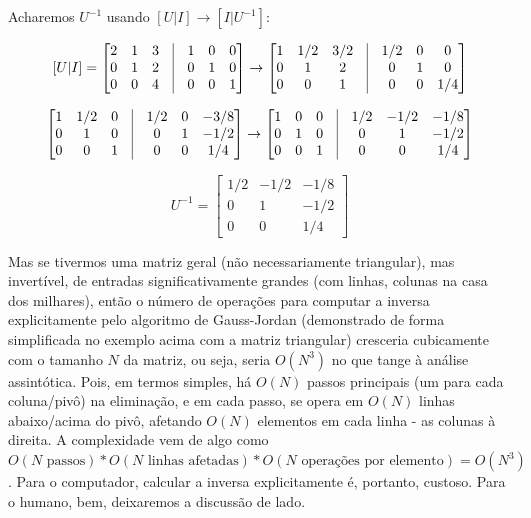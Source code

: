 \documentclass{article}
\begin{document}
    Acharemos $U^{-1}$ usando $[U|I] \rightarrow [I|U^{-1}]$:

    \[
    [U|I] = 
    \begin{bmatrix}
    2 & 1 & 3 & \vline & 1 & 0 & 0 \\
    0 & 1 & 2 & \vline & 0 & 1 & 0 \\
    0 & 0 & 4 & \vline & 0 & 0 & 1
    \end{bmatrix}
    \rightarrow
    \begin{bmatrix}
    1 & 1/2 & 3/2 & \vline &  1/2 & 0 & 0 \\
    0 & 1 & 2 & \vline & 0 &  1 & 0 \\
    0 & 0 & 1 & \vline & 0 &  0 & 1/4
    \end{bmatrix}
    \]

    \[
    \begin{bmatrix}
    1 & 1/2 & 0 & \vline & 1/2 & 0 & -3/8 \\
    0 & 1 & 0 & \vline & 0 & 1 & -1/2 \\
    0 & 0 & 1 & \vline & 0 & 0 & 1/4
    \end{bmatrix}
    \rightarrow
    \begin{bmatrix}
    1 & 0 & 0 & \vline & 1/2 & -1/2 & -1/8 \\
    0 & 1 & 0 & \vline & 0 & 1 & -1/2 \\
    0 & 0 & 1 & \vline & 0 & 0 & 1/4
    \end{bmatrix}
    \]

    \[
    U^{-1} =
    \begin{bmatrix}
    1/2 & -1/2 & -1/8 \\
    0 & 1 & -1/2 \\
    0 & 0 & 1/4
    \end{bmatrix}
    \]

    Mas se tivermos uma matriz geral (não necessariamente triangular), mas invertível, de entradas significativamente grandes (com linhas, colunas na casa dos milhares), então o número de operações para computar a inversa explicitamente pelo algoritmo de Gauss-Jordan (demonstrado de forma simplificada no exemplo acima com a matriz triangular) cresceria cubicamente com o tamanho $N$ da matriz, ou seja, seria $O(N^3)$ no que tange à análise assintótica. Pois, em termos simples, há $O(N)$ passos principais (um para cada coluna/pivô) na eliminação, e em cada passo, se opera em $O(N)$ linhas abaixo/acima do pivô, afetando $O(N)$ elementos em cada linha - as colunas à direita. A complexidade vem de algo como $O(N \text{ passos}) * O(N \text{ linhas afetadas}) * O(N \text{ operações por elemento}) = O(N^3)$. Para o computador, calcular a inversa explicitamente é, portanto, custoso. Para o humano, bem, deixaremos a discussão de lado.
\end{document}
